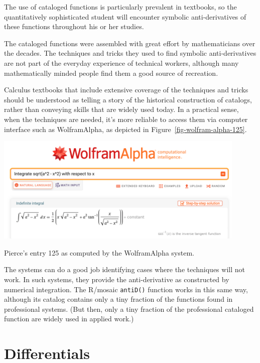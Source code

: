 \documentclass[
  letterpaper,
  DIV=11,
  numbers=noendperiod,
  oneside]{scrreprt}
\begin{document}
The use of cataloged functions is particularly prevalent in textbooks,
so the quantitatively sophisticated student will encounter symbolic
anti-derivatives of these functions throughout his or her studies.

The cataloged functions were assembled with great effort by
mathematicians over the decades. The techniques and tricks they used to
find symbolic anti-derivatives are not part of the everyday experience
of technical workers, although many mathematically minded people find
them a good source of recreation.

Calculus textbooks that include extensive coverage of the techniques and
tricks should be understood as telling a story of the historical
construction of catalogs, rather than conveying skills that are widely
used today. In a practical sense, when the techniques are needed, it's
more reliable to access them via computer interface such as
WolframAlpha, as depicted in Figure~\ref{fig-wolfram-alpha-125}.

\begin{marginfigure}

{\centering \includegraphics[width=0.9\textwidth,height=\textheight]{Accumulation/www/wolfram-alpha-125.png}

}

\caption{\label{fig-wolfram-alpha-125}Pierce's entry 125 as computed by
the WolframAlpha system.}

\end{marginfigure}

The systems can do a good job identifying cases where the techniques
will not work. In such systems, they provide the anti-derivative as
constructed by numerical integration. The R/mosaic \texttt{antiD()}
function works in this same way, although its catalog contains only a
tiny fraction of the functions found in professional systems. (But then,
only a tiny fraction of the professional cataloged function are widely
used in applied work.)

\hypertarget{differentials}{%
\section{Differentials}\label{differentials}}
\end{document}
